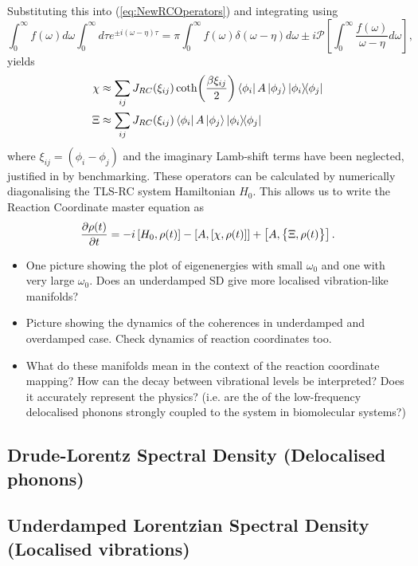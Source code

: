 \documentclass[]{article}
\begin{document}
Substituting this into (\ref{eq:NewRCOperators}) and integrating using 
\begin{equation}
	\label{eq:Sokhotski}
	\int_{0}^{\infty}f(\omega)d\omega\int_{0}^{\infty}d\tau e^{\pm i(\omega-\eta)\tau} = \pi\int_{0}^{\infty}f(\omega)\delta(\omega-\eta)d\omega \pm i \mathcal{P}\left[\int_{0}^{\infty}\frac{f(\omega)}{\omega-\eta}d\omega\right],
\end{equation}
yields
\begin{align}
	\label{eq:NewRCOperatorsDiscrete}
	\chi &\approx \sum_{ij}J_{RC}(\xi_{ij}) \coth(\frac{\beta \xi_{ij}}{2})\bra{\phi_i}A\ket{\phi_j}\dyad{\phi_i}{\phi_j}\\
	\Xi &\approx \sum_{ij}J_{RC}(\xi_{ij}) \bra{\phi_i}A\ket{\phi_j}\dyad{\phi_i}{\phi_j}
\end{align}
where $\xi_{ij} = (\phi_i-\phi_j)$ and the imaginary Lamb-shift terms have been neglected, justified in \cite{OriginalRCJakeAhsan} by benchmarking. These operators can be calculated by numerically diagonalising the TLS-RC system Hamiltonian $H_0$. This allows us to write the Reaction Coordinate master equation as
\begin{equation}
\pdv{\rho(t)}{t} = -i\left[H_0, \rho(t)\right] - \left[A, \left[\chi, \rho(t)\right]\right] + \left[A, \big\lbrace\Xi, \rho(t)\big\rbrace\right].
\end{equation}
\begin{itemize}
	\item One picture showing the plot of eigenenergies with small $\omega_0$ and one with very large $\omega_0$. Does an underdamped SD give more localised vibration-like manifolds?
	\item Picture showing the dynamics of the coherences in underdamped and overdamped case. Check dynamics of reaction coordinates too.
	\item What do these manifolds mean in the context of the reaction coordinate mapping? How can the decay between vibrational levels be interpreted? Does it accurately represent the physics? (i.e. are the of the low-frequency delocalised phonons strongly coupled to the system in biomolecular systems?)
\end{itemize}

\subsection{Drude-Lorentz Spectral Density (Delocalised phonons)}


\subsection{Underdamped Lorentzian Spectral Density (Localised vibrations)}
\end{document}
